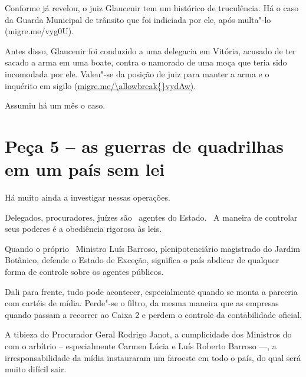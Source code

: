 Conforme  já revelou, o juiz Glaucenir tem um histórico de
truculência. Há o caso da Guarda Municipal de trânsito que foi indiciada
por ele, após multa"-lo
({migre.me/\allowbreak{}vyg0U)}.

Antes disso, Glaucenir foi conduzido a uma delegacia em Vitória, acusado
de ter sacado a arma em uma boate, contra o namorado de uma moça que
teria sido incomodada por ele. Valeu"-se da posição de juiz para manter a
arma e o inquérito em sigilo (\url{migre.me/\allowbreak{}vydAw)}.

Assumiu há um mês o caso.

\section{Peça 5 -- as guerras de quadrilhas em um país sem lei}

Há muito ainda a investigar nessas operações.

Delegados, procuradores, juízes são ~agentes do Estado.~ A maneira de
controlar seus poderes é a obediência rigorosa às leis.

Quando o próprio~ Ministro Luís Barroso, plenipotenciário magistrado do
Jardim Botânico, defende o Estado de Exceção, significa o país abdicar
de qualquer forma de controle sobre os agentes públicos.

Dali para frente, tudo pode acontecer, especialmente quando se monta a
parceria com cartéis de mídia. Perde"-se o filtro, da mesma maneira que
as empresas quando passam a recorrer ao Caixa 2 e perdem o controle da
contabilidade oficial.

A tibieza do Procurador Geral Rodrigo Janot, a cumplicidade dos
Ministros do  com o arbítrio -- especialmente Carmen Lúcia e Luís
Roberto Barroso \mbox{---,} a irresponsabilidade da mídia instauraram um
faroeste em todo o país, do qual será muito difícil sair.
